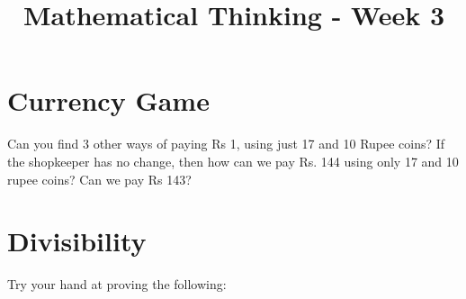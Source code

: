 \documentclass[12pt]{exam}
\title{Mathematical Thinking - Week 3}
\begin{document}
\maketitle
\tableofcontents
\section{Currency Game}
\begin{questions}
\question Can you find 3 other ways of paying Rs 1, using just 17 and 10 Rupee coins?
\question If the shopkeeper has no change, then how can we pay Rs. 144 using only 17 and 10 rupee coins? Can we pay Rs 143?
\end{questions}

\section{Divisibility}
\begin{questions}
\question Try your hand at proving the following:
\end{questions}
\end{document}

